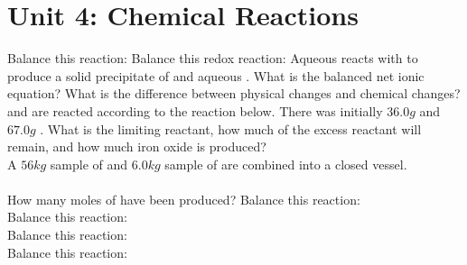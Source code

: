 \documentclass[../main.tex]{subfiles}
\begin{document}
\section{Unit 4: Chemical Reactions}
\ProblemSet
Balance this reaction:
\ProblemSet
Balance this redox reaction: 
\ProblemSet
Aqueous  reacts with  to produce a solid precipitate of  and aqueous . What is the balanced net ionic equation? 
\ProblemSet
What is the difference between physical changes and chemical changes?
\ProblemSet
{} and  are reacted according to the reaction below. There was initially \(36.0g\)  and \(67.0g\) . What is the limiting reactant, how much of the excess reactant will remain, and how much iron oxide is produced? \\
\ProblemSet
A \(56kg\) sample of  and \(6.0kg\) sample of  are combined into a closed vessel. \\
 \\
How many moles of  have been produced?
\ProblemSet
Balance this reaction: \\
\ProblemSet
Balance this reaction:\\
\ProblemSet
Balance this reaction: \\
\ProblemSet
Balance this reaction: \\
\end{document}
